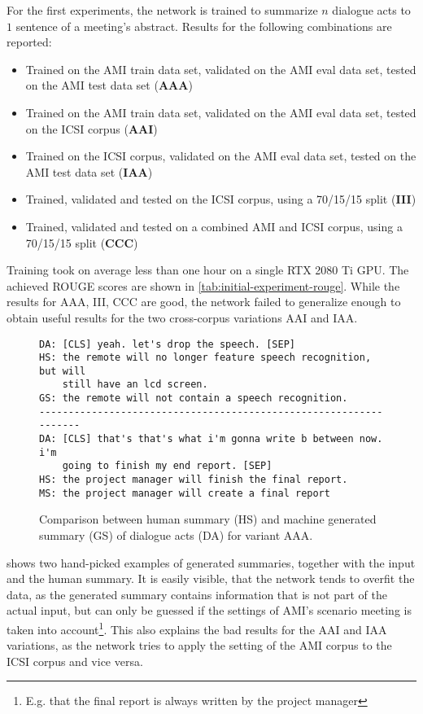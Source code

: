 For the first experiments, the network is trained to summarize $n$ dialogue acts to $1$ sentence of a meeting's abstract.
Results for the following combinations are reported:

\begin{itemize}
\item Trained on the AMI train data set, validated on the AMI eval data set, tested on the AMI test data set (\textbf{AAA})
\item Trained on the AMI train data set, validated on the AMI eval data set, tested on the ICSI corpus (\textbf{AAI})
\item Trained on the ICSI corpus, validated on the AMI eval data set, tested on the AMI test data set (\textbf{IAA})
\item Trained, validated and tested on the ICSI corpus, using a 70/15/15 split (\textbf{III})
\item Trained, validated and tested on a combined AMI and ICSI corpus, using a 70/15/15 split (\textbf{CCC})
\end{itemize}


Training took on average less than one hour on a single RTX 2080 Ti GPU.
The achieved ROUGE scores are shown in \cref{tab:initial-experiment-rouge}.
While the results for AAA, III, CCC are good, the network failed to generalize enough to obtain useful results for the two cross-corpus variations AAI and IAA.

\begin{figure}[h]
\begin{lstlisting}[numbers=none]
DA: [CLS] yeah. let's drop the speech. [SEP]
HS: the remote will no longer feature speech recognition, but will
    still have an lcd screen.
GS: the remote will not contain a speech recognition.
------------------------------------------------------------------
DA: [CLS] that's that's what i'm gonna write b between now. i'm
    going to finish my end report. [SEP]
HS: the project manager will finish the final report.
MS: the project manager will create a final report
\end{lstlisting}
\caption{Comparison between human summary (HS) and machine generated summary (GS) of dialogue acts (DA) for variant AAA.}
\label{fig:initial-experiment-example}
\end{figure}

 shows two hand-picked examples of generated summaries, together with the input and the human summary.
It is easily visible, that the network tends to overfit the data, as the generated summary contains information that is not part of the actual input, but can only be guessed if the settings of AMI's scenario meeting is taken into account\footnote{E.g. that the final report is always written by the project manager}.
This also explains the bad results for the AAI and IAA variations, as the network tries to apply the setting of the AMI corpus to the ICSI corpus and vice versa.

